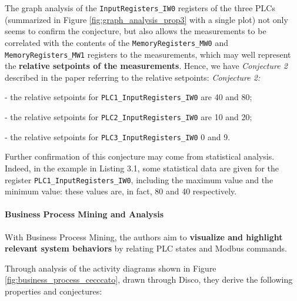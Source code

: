 The graph analysis of the \texttt{InputRegisters\_IW0} registers of the three PLCs (summarized in Figure \ref{fig:graph_analysis_prop3} with a single plot) not only seems to confirm the conjecture, but also allows the measurements to be correlated with the contents of the \texttt{MemoryRegisters\_MW0} and \texttt{MemoryRegisters\_MW1} registers to the measurements, which may well represent the \textbf{relative setpoints of the measurements}. Hence, we have \textit{Conjecture 2} described in the paper referring to the relative setpoints:\newline\newline
\colorbox{backcolourtext}{\emph{Conjecture 2:}} 

	- the relative setpoints for \texttt{PLC1\_InputRegisters\_IW0} are 40 and 80;
	
	- the relative setpoints for \texttt{PLC2\_InputRegisters\_IW0} are 10 and 20;
	
	- the relative setpoints for \texttt{PLC3\_InputRegisters\_IW0} 0 and 9. 

\bigskip
Further confirmation of this conjecture may come from statistical analysis. Indeed, in the example in Listing 3.1, some statistical data are given for the register \texttt{PLC1\_InputRegisters\_IW0}, including the maximum value and the minimum value: these values are, in fact, 80 and 40 respectively.

\paragraph{Business Process Mining and Analysis}
\label{par:3_process_mining_appl}
With Business Process Mining, the authors aim to \textbf{visualize and highlight relevant system behaviors} by relating PLC states and Modbus commands.

\bigskip
Through analysis of the activity diagrams shown in Figure \ref{fig:business_process_cecccato}, drawn through Disco, they derive the following properties and conjectures:

